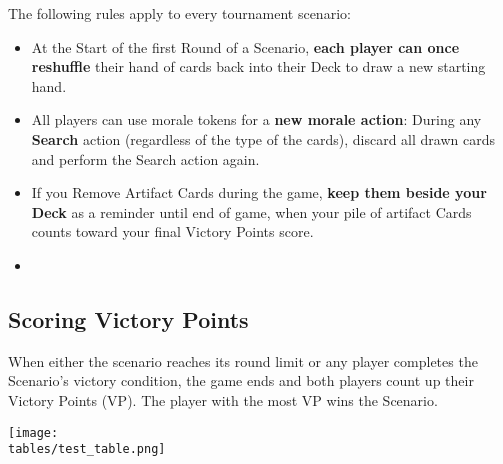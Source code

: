 \begin{multicols*}{2}
The following rules apply to every tournament scenario:
\begin{itemize}
    \item At the Start of the first Round of a Scenario, \textbf{each player can once reshuffle} their hand of cards back into their Deck to draw a new starting hand.
    \item All players can use morale tokens for a \textbf{new morale action}: During any \textbf{Search} action (regardless of the type of the cards), discard all drawn cards and perform the Search action again.
    \item If you Remove Artifact Cards during the game, \textbf{keep them beside your Deck} as a reminder until end of game, when your pile of artifact Cards counts toward your final Victory Points score.
    \item
\end{itemize}

\subsection*{Scoring Victory Points}
When either the scenario reaches its round limit or any player completes the Scenario's victory condition, the game ends and both players count up their Victory Points (VP).
The player with the most VP wins the Scenario.

\texttt{[image: \\tables/test\_table.png]}



\end{multicols*}
